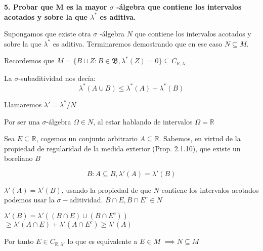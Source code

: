
\textbf{5. Probar que M es la mayor $\sigma$ -\'algebra que contiene los intervalos acotados y sobre la que $\lambda ^*$ es aditiva.}



Supongamos que existe otra $\sigma$ -\'algebra $N$ que contiene los intervalos acotados y sobre la que $\lambda ^*$ es aditiva. Terminaremos demostrando que en ese caso $N \subseteq M$.

Recordemos que $M=\{B \cup Z : B\in \mathfrak{B}, \lambda ^*(Z)=0\} \subseteq C_{\mathbb{R},\lambda }$

La $\sigma$-subaditividad nos decía:
\[\lambda ^*(A\cup B) \leq \lambda ^* (A)+ \lambda ^*(B)\]

Llamaremos $\lambda '=\lambda	^* / N$

Por ser una $\sigma$-\'algebra $\Omega \in N$, al estar hablando de intervalos $\Omega = \mathbb{R}$

Sea $E\subseteq \mathbb{R}$, cogemos un conjunto arbitrario $A\subseteq \mathbb{R}$.
Sabemos, en virtud de la propiedad de regularidad de la medida exterior (Prop. 2.1.10), que existe un boreliano $B$

\[ B:A\subseteq B, \lambda '(A)=\lambda '(B) \]

$\lambda '(A)=\lambda '(B)$,  usando la propiedad de que $N$ contiene los intervalos acotados podemos usar la $\sigma-$aditividad. 
$B\cap E, B\cap E^c \in N$ 

$\lambda '(B) = \lambda'\left( (B\cap E) \cup (B\cap E^c) \right) $
$\geqslant\lambda '(A\cap E) + \lambda'(A\cap E^c) \geqslant \lambda '(A)$

Por tanto $E \in C_{\mathbb{R},\lambda '}$ lo que es equivalente a $E \in M$
$\implies N \subseteq M$
 
